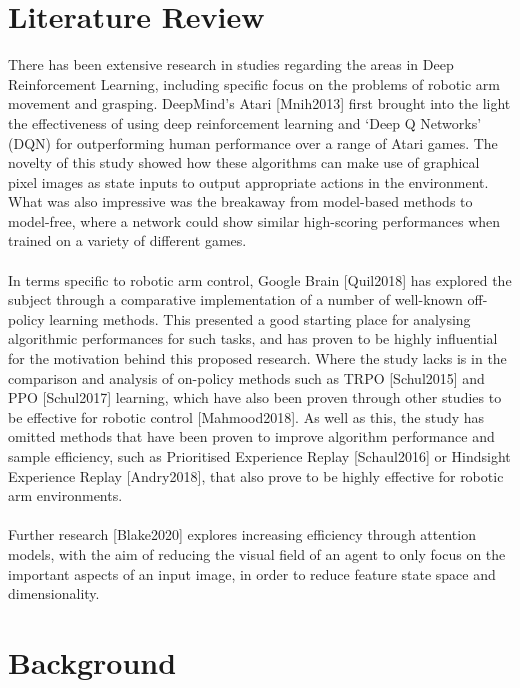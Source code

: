 \documentclass{article}
\begin{document}
\section{Literature Review}
There has been extensive research in studies regarding the areas in Deep Reinforcement Learning, including specific focus on the problems of robotic arm movement and grasping. DeepMind’s Atari [Mnih2013] first brought into the light the effectiveness of using deep reinforcement learning and ‘Deep Q Networks’ (DQN) for outperforming human performance over a range of Atari games. The novelty of this study showed how these algorithms can make use of graphical pixel images as state inputs to output appropriate actions in the environment. What was also impressive was the breakaway from model-based methods to model-free, where a network could show similar high-scoring performances when trained on a variety of different games.
\\\\
In terms specific to robotic arm control, Google Brain [Quil2018] has explored the subject through a comparative implementation of a number of well-known off-policy learning methods. This presented a good starting place for analysing algorithmic performances for such tasks, and has proven to be highly influential for the motivation behind this proposed research. Where the study lacks is in the comparison and analysis of on-policy methods such as TRPO [Schul2015] and PPO [Schul2017] learning, which have also been proven through other studies to be effective for robotic control [Mahmood2018]. As well as this, the study has omitted methods that have been proven to improve algorithm performance and sample efficiency, such as Prioritised Experience Replay [Schaul2016] or Hindsight Experience Replay [Andry2018], that also prove to be highly effective for robotic arm environments.
\\\\
Further research [Blake2020] explores increasing efficiency through attention models, with the aim of reducing the visual field of an agent to only focus on the important aspects of an input image, in order to reduce feature state space and dimensionality.


\section{Background}
\end{document}
